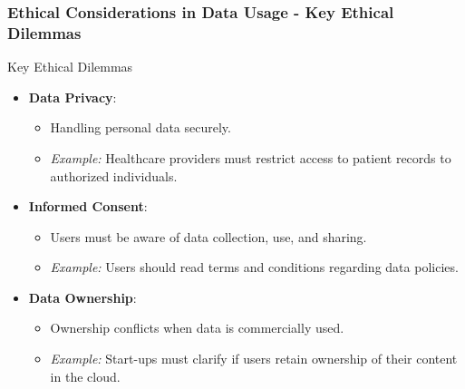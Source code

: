 \documentclass[aspectratio=169]{beamer}
\begin{document}
\begin{frame}[fragile]
    \frametitle{Ethical Considerations in Data Usage - Key Ethical Dilemmas}
    \begin{block}{Key Ethical Dilemmas}
        \begin{itemize}
            \item \textbf{Data Privacy}: 
                \begin{itemize}
                    \item Handling personal data securely.
                    \item \textit{Example:} Healthcare providers must restrict access to patient records to authorized individuals.
                \end{itemize}
            \item \textbf{Informed Consent}: 
                \begin{itemize}
                    \item Users must be aware of data collection, use, and sharing.
                    \item \textit{Example:} Users should read terms and conditions regarding data policies.
                \end{itemize}
            \item \textbf{Data Ownership}: 
                \begin{itemize}
                    \item Ownership conflicts when data is commercially used.
                    \item \textit{Example:} Start-ups must clarify if users retain ownership of their content in the cloud.
                \end{itemize}
        \end{itemize}
    \end{block}
\end{frame}
\end{document}
